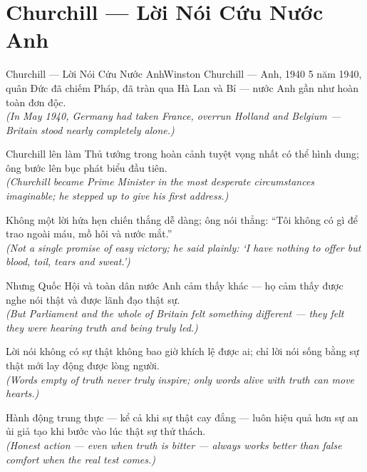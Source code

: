 \section{Churchill --- Lời Nói Cứu Nước Anh}
\begin{truyen}{Churchill --- Lời Nói Cứu Nước Anh}{Winston Churchill --- Anh, 1940}
 5 năm 1940, quân Đức đã chiếm Pháp, đã tràn qua Hà Lan và Bỉ --- nước Anh gần như hoàn toàn đơn độc.\\[4pt]
\textit{(In May 1940, Germany had taken France, overrun Holland and Belgium --- Britain stood nearly completely alone.)}

Churchill lên làm Thủ tướng trong hoàn cảnh tuyệt vọng nhất có thể hình dung; ông bước lên bục phát biểu đầu tiên.\\[4pt]
\textit{(Churchill became Prime Minister in the most desperate circumstances imaginable; he stepped up to give his first address.)}

Không một lời hứa hẹn chiến thắng dễ dàng; ông nói thẳng: ``Tôi không có gì để trao ngoài máu, mồ hôi và nước mắt.''\\[4pt]
\textit{(Not a single promise of easy victory; he said plainly: `I have nothing to offer but blood, toil, tears and sweat.')}

Nhưng Quốc Hội và toàn dân nước Anh cảm thấy khác --- họ cảm thấy được nghe nói thật và được lãnh đạo thật sự.\\[4pt]
\textit{(But Parliament and the whole of Britain felt something different --- they felt they were hearing truth and being truly led.)}

Lời nói không có sự thật không bao giờ khích lệ được ai; chỉ lời nói sống bằng sự thật mới lay động được lòng người.\\[4pt]
\textit{(Words empty of truth never truly inspire; only words alive with truth can move hearts.)}

\end{truyen}
\begin{baihoc}
  Hành động trung thực --- kể cả khi sự thật cay đắng --- luôn hiệu quả hơn sự an ủi giả tạo khi bước vào lúc thật sự thử thách.\\[4pt]
  \textit{(Honest action --- even when truth is bitter --- always works better than false comfort when the real test comes.)}
\end{baihoc}

